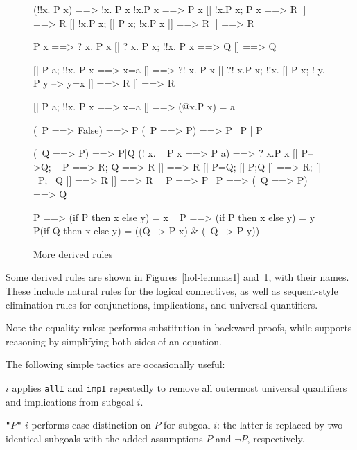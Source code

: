 \begin{figure}
\begin{ttbox}\makeatother
{}      (!!x. P x) ==> !x. P x
      !x.P x ==> P x
      [| !x.P x;  P x ==> R |] ==> R
  [| !x.P x;  [| P x; !x.P x |] ==> R |] ==> R

       P x ==> ? x. P x
       [| ? x. P x; !!x. P x ==> Q |] ==> Q

      [| P a;  !!x. P x ==> x=a |] ==> ?! x. P x
      [| ?! x.P x;  !!x. [| P x;  ! y. P y --> y=x |] ==> R 
          |] ==> R

 [| P a;  !!x. P x ==> x=a |] ==> (@x.P x) = a

          (~P ==> False) ==> P
       (~P ==> P) ==> P
 ~P | P

          (~Q ==> P) ==> P|Q
            (! x. ~ P x ==> P a) ==> ? x.P x
           [| P-->Q; ~ P ==> R; Q ==> R |] ==> R
           [| P=Q;  [| P;Q |] ==> R;  [| ~P; ~Q |] ==> R |] ==> R
         ~~P ==> P
            ~P ==> (~Q ==> P) ==> Q

            P ==> (if P then x else y) = x
        ~ P ==> (if P then x else y) = y
       P(if Q then x else y) = ((Q --> P x) & (~Q --> P y))
\end{ttbox}
\caption{More derived rules} \label{hol-lemmas2}
\end{figure}

Some derived rules are shown in Figures~\ref{hol-lemmas1}
and~\ref{hol-lemmas2}, with their {\ML} names.  These include natural rules
for the logical connectives, as well as sequent-style elimination rules for
conjunctions, implications, and universal quantifiers.  

Note the equality rules:  performs substitution in
backward proofs, while  supports reasoning by
simplifying both sides of an equation.

The following simple tactics are occasionally useful:
\begin{ttdescription}
\item[\ttindexbold{strip_tac} $i$] applies \texttt{allI} and \texttt{impI}
  repeatedly to remove all outermost universal quantifiers and implications
  from subgoal $i$.
\item[\ttindexbold{case_tac} {\tt"}$P${\tt"} $i$] performs case distinction
  on $P$ for subgoal $i$: the latter is replaced by two identical subgoals
  with the added assumptions $P$ and $\neg P$, respectively.
\end{ttdescription}


